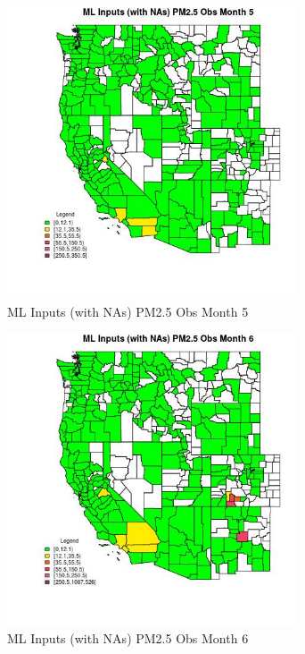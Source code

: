 \begin{figure} 
\centering  
\includegraphics[width=0.77\textwidth]{Code_Outputs/Report_ML_input_PM25_Step4_part_e_de_duplicated_aves_compiled_2019-05-21wNAs_CountyPM25_ObsmedianMonth5.jpg} 
\caption{\label{fig:Report_ML_input_PM25_Step4_part_e_de_duplicated_aves_compiled_2019-05-21wNAsCountyPM25_ObsmedianMonth5}ML Inputs (with NAs) PM2.5 Obs Month 5} 
\end{figure} 
 

\begin{figure} 
\centering  
\includegraphics[width=0.77\textwidth]{Code_Outputs/Report_ML_input_PM25_Step4_part_e_de_duplicated_aves_compiled_2019-05-21wNAs_CountyPM25_ObsmedianMonth6.jpg} 
\caption{\label{fig:Report_ML_input_PM25_Step4_part_e_de_duplicated_aves_compiled_2019-05-21wNAsCountyPM25_ObsmedianMonth6}ML Inputs (with NAs) PM2.5 Obs Month 6} 
\end{figure} 
 

